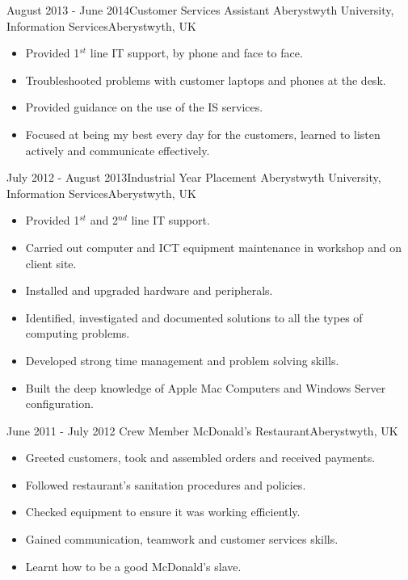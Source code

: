\documentclass[11pt,a4paper]{moderncv}
\begin{document}
\cventry
	{August 2013 - June 2014}{Customer Services Assistant}
	{Aberystwyth University, Information Services}{Aberystwyth, UK}
	{}{
        \begin{itemize}
            \item Provided 1$^{st}$ line IT support, by phone and face to face.
            \item Troubleshooted problems with customer laptops and phones at the desk.
            \item Provided guidance on the use of the IS services.
            \item Focused at being my best every day for the customers, learned to listen actively and communicate effectively.
        \end{itemize}
    }
	
\cventry
	{July 2012 - August 2013}{Industrial Year Placement}
	{Aberystwyth University, Information Services}{Aberystwyth, UK}
	{}{
        \begin{itemize}
            \item Provided 1$^{st}$ and 2$^{nd}$ line IT support.
            \item Carried out computer and ICT equipment maintenance in workshop and on client site.
            \item Installed and upgraded hardware and peripherals.
            \item Identified, investigated and documented solutions to all the types of computing problems.
            \item Developed strong time management and problem solving skills.
            \item Built the deep knowledge of Apple Mac Computers and Windows Server configuration. 
        \end{itemize}
    }
    
\cventry
	{June 2011 - July 2012 }{Crew Member}
	{McDonald's Restaurant}{Aberystwyth, UK}
	{}{
    	\begin{itemize}
           \item Greeted customers, took and assembled orders and received payments.
           \item Followed restaurant's sanitation procedures and policies.
           \item Checked equipment to ensure it was working efficiently.
           \item Gained communication, teamwork and customer services skills.
           \item Learnt how to be a good McDonald's slave.
    	\end{itemize}
	}
	
\end{document}
